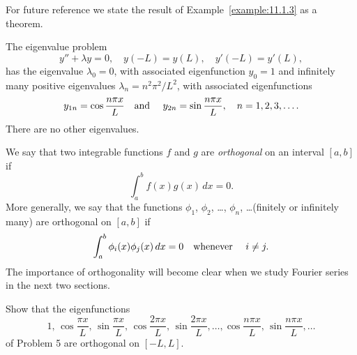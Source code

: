 For future reference we state the result of Example~\ref{example:11.1.3} as a theorem.

\begin{theorem}
  \color{blue}
  \label{thmtype:11.1.6} The eigenvalue problem
  \[
    y''+\lambda y=0,\quad y(-L)=y(L),\quad y'(-L)=y'(L),
  \]
  has the eigenvalue $\lambda_{0}=0$, with associated eigenfunction $y_{0}=1$ and infinitely many
  positive eigenvalues $\lambda_{n}=n^{2}\pi^{2}/L^{2}$, with associated eigenfunctions
  \[
    y_{1n}=\cos\frac{n\pi x}{L}\mbox{\quad and \quad}y_{2n}=\sin\frac{n\pi x}{L},\quad n=1,2,3,\dots.
  \]
  There are no other eigenvalues.
\end{theorem}


\noindent
We say that two integrable functions $f$ and $g$ are {\color{blue}\it orthogonal\/} on an interval
$[a,b]$ if
\[
  \int_{a}^{b}f(x)g(x)\,dx=0.
\]
More generally, we say that the functions $\phi_{1}$, $\phi_{2}$, \dots, $\phi_{n}$, \dots (finitely
or infinitely many) are orthogonal on $[a,b]$ if
\[
  \int_{a}^{b}\phi_{i}(x)\phi_{j}(x)\,dx=0\mbox{\quad whenever \quad}i\ne j.
\]
The importance of orthogonality will become clear when we study Fourier series in the next two
sections.

\begin{example}
  \label{example:11.1.4} \rm Show that the eigenfunctions
  \begin{equation}
    \label{eq:11.1.11}1,\,\cos\frac{\pi x}{L},\,\sin\frac{\pi x}{L}, \,\cos\frac{2\pi x}{L},\,\sin\frac{2\pi x}{L},\dots, \cos\frac{n\pi x}{L},\,\sin\frac{n\pi x}{L},\dots
  \end{equation}
  of Problem 5 are orthogonal on $[-L,L]$.
\end{example}

